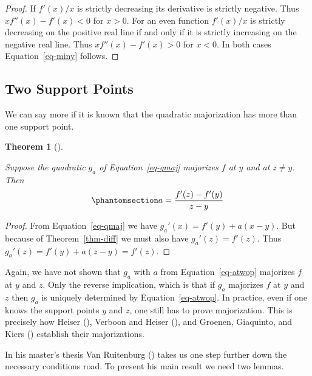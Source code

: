 \documentclass[
  12pt,
  letterpaper,
  DIV=11,
  numbers=noendperiod]{scrartcl}
\theoremstyle{plain}
\theoremstyle{plain}
\newtheorem{theorem}{Theorem}[section]
\theoremstyle{plain}
\theoremstyle{definition}
\theoremstyle{definition}
\theoremstyle{remark}
\begin{document}
\begin{proof}
If \(f'(x)/x\) is strictly decreasing its derivative is strictly
negative. Thus \(xf''(x)-f'(x)<0\) for \(x>0\). For an even function
\(f'(x)/x\) is strictly decreasing on the positive real line if and only
if it is strictly increasing on the negative real line. Thus
\(xf''(x)-f'(x)>0\) for \(x<0\). In both cases Equation~\ref{eq-miny}
follows.
\end{proof}

\subsection{Two Support Points}\label{sec-twosupport}

We can say more if it is known that the quadratic majorization has more
than one support point.

\begin{theorem}[]\protect\hypertarget{thm-twop}{}\label{thm-twop}

Suppose the quadratic \(g_a\) of Equation~\ref{eq-qmaj} majorizes \(f\)
at \(y\) and at \(z\not= y\). Then
\begin{equation}\phantomsection\label{eq-atwop}{
a=\frac{f'(z)-f'(y)}{z-y}
}\end{equation}

\end{theorem}

\begin{proof}
From Equation~\ref{eq-qmaj} we have \(g_a'(x)=f'(y)+a(x-y)\). But
because of Theorem~\ref{thm-diff} we must also have \(g_a'(z)=f'(z)\).
Thus \(g_a'(z)=f'(y)+a(z-y)=f'(z)\).
\end{proof}

Again, we have not shown that \(g_a\) with \(a\) from
Equation~\ref{eq-atwop} majorizes \(f\) at \(y\) and \(z\). Only the
reverse implication, which is that if \(g_a\) majorizes \(f\) at \(y\)
and \(z\) then \(g_a\) is uniquely determined by
Equation~\ref{eq-atwop}. In practice, even if one knows the support
points \(y\) and \(z\), one still has to prove majorization. This is
precisely how Heiser (), Verboon and
Heiser (), and Groenen, Giaquinto,
and Kiers () establish
their majorizations.

In his master's thesis Van Ruitenburg
() takes us one step further down
the necessary conditions road. To present his main result we need two
lemmas.
\end{document}
